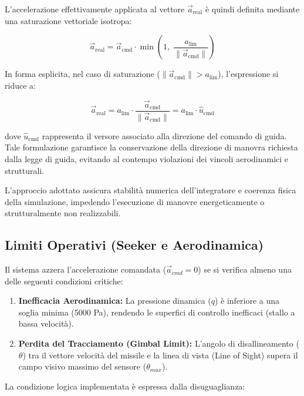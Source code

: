 \documentclass[12pt,a4paper]{article}
\begin{document}
L’accelerazione effettivamente applicata al vettore $\vec{a}_{\text{real}}$ è quindi
definita mediante una saturazione vettoriale isotropa:

\begin{equation}
\vec{a}_{\text{real}} =
\vec{a}_{\text{cmd}} \cdot
\min \left( 1,\; \frac{a_{\text{lim}}}{\|\vec{a}_{\text{cmd}}\|} \right)
\end{equation}

In forma esplicita, nel caso di saturazione
($\|\vec{a}_{\text{cmd}}\| > a_{\text{lim}}$), l’espressione si riduce a:

\begin{equation}
\vec{a}_{\text{real}} =
a_{\text{lim}} \cdot
\frac{\vec{a}_{\text{cmd}}}{\|\vec{a}_{\text{cmd}}\|}
=
a_{\text{lim}} \cdot \hat{u}_{\text{cmd}}
\end{equation}

dove $\hat{u}_{\text{cmd}}$ rappresenta il versore associato alla direzione del
comando di guida. Tale formulazione garantisce la conservazione della direzione
di manovra richiesta dalla legge di guida, evitando al contempo violazioni dei
vincoli aerodinamici e strutturali.

L’approccio adottato assicura stabilità numerica dell’integratore e coerenza
fisica della simulazione, impedendo l’esecuzione di manovre energeticamente o
strutturalmente non realizzabili.

\subsection{Limiti Operativi (Seeker e Aerodinamica)}

 Il sistema azzera l'accelerazione comandata ($\vec{a}_{cmd} = 0$) se si verifica almeno una delle seguenti condizioni critiche:

\begin{enumerate}
    \item \textbf{Inefficacia Aerodinamica:} La pressione dinamica ($q$) è inferiore a una soglia minima (5000 Pa), rendendo le superfici di controllo inefficaci (stallo a bassa velocità).
    \item \textbf{Perdita del Tracciamento (Gimbal Limit):} L'angolo di disallineamento ($\theta$) tra il vettore velocità del missile e la linea di vista (Line of Sight) supera il campo visivo massimo del sensore ($\theta_{max}$).
\end{enumerate}

La condizione logica implementata è espressa dalla disuguaglianza:
\end{document}
